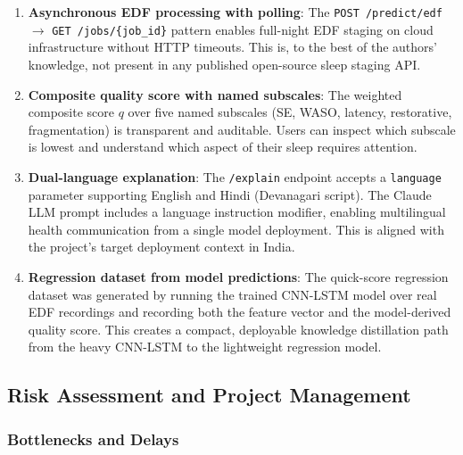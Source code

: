 \documentclass[10pt]{article}
\begin{document}
\begin{enumerate}
  \item \textbf{Asynchronous EDF processing with polling}: The \texttt{POST /predict/edf} $\rightarrow$ \texttt{GET /jobs/\{job\_id\}} pattern enables full-night EDF staging on cloud infrastructure without HTTP timeouts. This is, to the best of the authors' knowledge, not present in any published open-source sleep staging API.

  \item \textbf{Composite quality score with named subscales}: The weighted composite score $q$ over five named subscales (SE, WASO, latency, restorative, fragmentation) is transparent and auditable. Users can inspect which subscale is lowest and understand which aspect of their sleep requires attention.

  \item \textbf{Dual-language explanation}: The \texttt{/explain} endpoint accepts a \texttt{language} parameter supporting English and Hindi (Devanagari script). The Claude LLM prompt includes a language instruction modifier, enabling multilingual health communication from a single model deployment. This is aligned with the project's target deployment context in India.

  \item \textbf{Regression dataset from model predictions}: The quick-score regression dataset was generated by running the trained CNN-LSTM model over real EDF recordings and recording both the feature vector and the model-derived quality score. This creates a compact, deployable knowledge distillation path from the heavy CNN-LSTM to the lightweight regression model.
\end{enumerate}

\subsection{Risk Assessment and Project Management}
\label{sec:riskAssessment}

\subsubsection{Bottlenecks and Delays}
\label{sec:bottlenecks}
\end{document}
